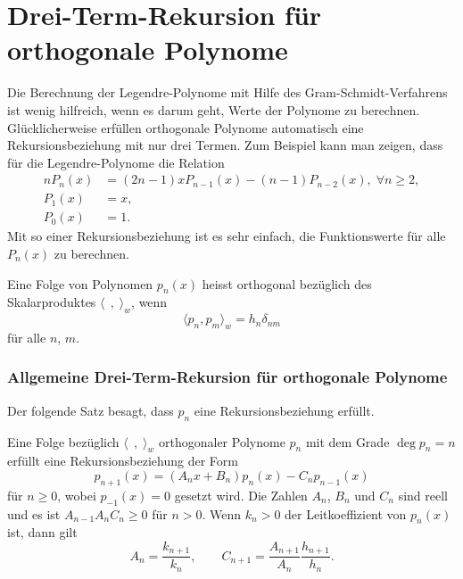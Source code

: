 %
%
%
\section{Drei-Term-Rekursion für orthogonale Polynome
\label{buch:orthogonal:section:drei-term-rekursion}}
Die Berechnung der Legendre-Polynome mit Hilfe des Gram-Schmidt-Verfahrens
ist wenig hilfreich, wenn es darum geht, Werte der Polynome zu berechnen.
Glücklicherweise erfüllen orthogonale Polynome automatisch eine 
Rekursionsbeziehung mit nur drei Termen.
Zum Beispiel kann man zeigen, dass für die Legendre-Polynome die
Relation
\begin{align*}
nP_n(x) &= (2n-1)xP_{n-1}(x) - (n-1)P_{n-2}(x),\;\forall n\ge 2,
\\
P_1(x) &= x,
\\
P_0(x) &= 1.
\end{align*}
Mit so einer Rekursionsbeziehung ist es sehr einfach, die Funktionswerte
für alle $P_n(x)$ zu berechnen.

\begin{definition}
Eine Folge von Polynomen $p_n(x)$ heisst orthogonal bezüglich des
Skalarproduktes $\langle\,\;,\;\rangle_w$, wenn 
\[
\langle p_n,p_m\rangle_w = h_n \delta_{nm}
\]
für alle $n$, $m$.
\end{definition}

\subsubsection{Allgemeine Drei-Term-Rekursion für orthogonale Polynome}
Der folgende Satz besagt, dass $p_n$ eine Rekursionsbeziehung erfüllt.

\begin{satz}
\label{buch:orthogonal:satz:drei-term-rekursion}
Eine Folge bezüglich $\langle\,\;,\;\rangle_w$ orthogonaler Polynome $p_n$ 
mit dem Grade $\deg p_n = n$ erfüllt eine Rekursionsbeziehung der Form
\begin{equation}
p_{n+1}(x)
=
(A_nx+B_n)p_n(x) - C_np_{n-1}(x)
\label{buch:orthogonal:eqn:rekursion}
\end{equation}
für $n\ge 0$, wobei $p_{-1}(x)=0$ gesetzt wird.
Die Zahlen $A_n$, $B_n$ und $C_n$ sind reell und es ist
$A_{n-1}A_nC_n\ge 0$ für $n>0$. 
Wenn $k_n>0$ der Leitkoeffizient von $p_n(x)$ ist, dann gilt
\begin{equation}
A_n=\frac{k_{n+1}}{k_n},
\qquad
C_{n+1} = \frac{A_{n+1}}{A_n}\frac{h_{n+1}}{h_n}.
\label{buch:orthogonal:eqn:koeffizientenrelation}
\end{equation}
\end{satz}

